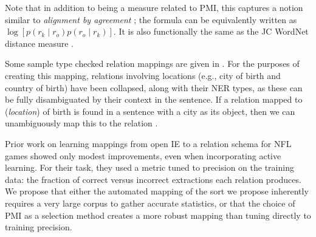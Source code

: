 Note that in addition to being a measure related to PMI, this captures
  a notion similar to \textit{alignment by agreement} 
  \cite{key:2006liang-alignment};
  the formula can be equivalently written as 
  $\log \left[ p(r_k \mid r_o) p(r_o \mid r_k)\right]$.
It is also functionally the same as the JC WordNet distance measure
  \cite{key:1997jc-similarity}.

Some sample type checked relation mappings are given in .
For the purposes of creating this mapping, relations involving
  locations (e.g., city of birth and country of birth) have been collapsed,
  along with their NER types, as these can be fully disambiguated by their
  context in the sentence.
If a relation mapped to (\textit{location}) of birth is found in a sentence
  with a city as its object, then we can unambiguously map this to the relation
  .
  
Prior work on learning mappings from open IE to a relation schema for NFL
  games \cite{key:2010soderland-nfl} showed only modest improvements, even
  when incorporating active learning.
For their task, they used a metric tuned to precision on the training data:
  the fraction of correct versus incorrect extractions each relation produces.
We propose that either the automated mapping of the sort we propose inherently
  requires a very large corpus to gather accurate statistics, or that the
  choice of PMI as a selection method creates a more robust mapping than tuning
  directly to training precision.


